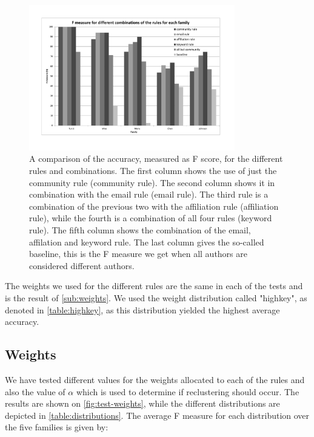 \begin{figure}[htb]
	\centering
		\includegraphics[width=0.80\textwidth]{./fig/test-rules.pdf}
	\caption{A comparison of the accuracy, measured as F score, for the different rules and combinations. The first column shows the use of just the community rule (community rule). The second column shows it in combination with the email rule (email rule). The third rule is a combination of the previous two with the affiliation rule (affiliation rule), while the fourth is a combination of all four rules (keyword rule). The fifth column shows the combination of the email, affilation and keyword rule. The last column gives the so-called baseline, this is the F measure we get when all authors are considered different authors.}
	\label{fig:test-rules}
\end{figure}

The weights we used for the different rules are the same in each of the tests and is the result of \autoref{sub:weights}. We used the weight distribution called "highkey", as denoted in \autoref{table:highkey}, as this distribution yielded the highest average accuracy.



\subsection{Weights}
\label{sub:weights}

We have tested different values for the weights allocated to each of the rules and also the value of $\alpha$ which is used to determine if reclustering should occur. The results are shown on \autoref{fig:test-weights}, while the different distributions are depicted in \autoref{table:distributions}. The average F measure for each distribution over the five families is given by:

